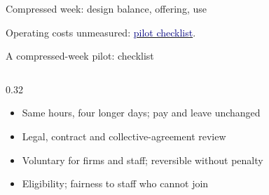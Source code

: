 \begin{frame}[t,label=B-puzzle]{Compressed week: design balance, offering, use}
  {\fontsize{9}{11}\selectfont\RaggedRight Operating costs unmeasured: \hyperlink{B-pilot}{\textcolor{Navy}{pilot checklist}}.\par}
\end{frame}

\begin{frame}[t,label=B-pilot]{A compressed-week pilot: checklist}
  \FrameTop
  \begin{columns}[T,onlytextwidth]
    \begin{column}{0.32\textwidth}
      \begin{itemize}\setlength{\itemsep}{0.04cm}
        \item Same hours, four longer days; pay and leave unchanged
        \item Legal, contract and collective-agreement review
        \item Voluntary for firms and staff; reversible without penalty
        \item Eligibility; fairness to staff who cannot join
      \end{itemize}

\end{column}
\end{columns}
\end{frame}
